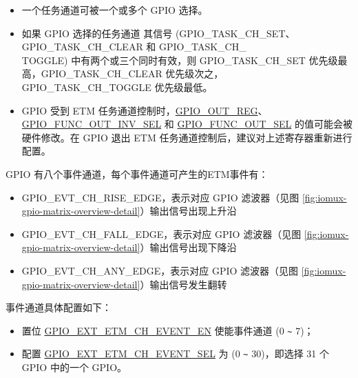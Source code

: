 \documentclass[main\_\_CN.tex]{subfiles}
\begin{document}
\begin{tiplisting}
\vspace{-2em}
\begin{itemize}
\item 一个任务通道可被一个或多个 GPIO 选择。

\item 如果 GPIO 选择的任务通道  其信号 (GPIO\_TASK\_CH\_SET、GPIO\_TASK\_CH\_CLEAR 和 GPIO\_TASK\_CH\_\\TOGGLE) 中有两个或三个同时有效，则 GPIO\_TASK\_CH\_SET 优先级最高，GPIO\_TASK\_CH\_CLEAR 优先级次之，GPIO\_TASK\_CH\_TOGGLE 优先级最低。

\item GPIO 受到 ETM 任务通道控制时，\hyperref[regdesc:GPIOOUTREG]{GPIO\_OUT\_REG}、\hyperref[fielddesc:GPIOFUNCNOUTINVSEL]{GPIO\_FUNC\_OUT\_INV\_SEL} 和 \hyperref[fielddesc:GPIOFUNCNOUTSEL]{GPIO\_FUNC\_OUT\_SEL} 的值可能会被硬件修改。在 GPIO 退出 ETM 任务通道控制后，建议对上述寄存器重新进行配置。
\end{itemize}
\end{tiplisting}

GPIO 有八个事件通道，每个事件通道可产生的ETM事件有：

\begin{itemize}
    \item GPIO\_EVT\_CH\_RISE\_EDGE，表示对应 GPIO 滤波器（见图 \ref{fig:iomux-gpio-matrix-overview-detail}）输出信号出现上升沿
    \item GPIO\_EVT\_CH\_FALL\_EDGE，表示对应 GPIO 滤波器（见图 \ref{fig:iomux-gpio-matrix-overview-detail}）输出信号出现下降沿
    \item GPIO\_EVT\_CH\_ANY\_EDGE，表示对应 GPIO 滤波器（见图 \ref{fig:iomux-gpio-matrix-overview-detail}）输出信号发生翻转
\end{itemize}

事件通道具体配置如下：

\begin{itemize}
    \item 置位 \hyperref[fielddesc:GPIOSDETMCH0EVENTEN]{GPIO\_EXT\_ETM\_CH\_EVENT\_EN} 使能事件通道  (0 \verb+~+ 7)；
    \item 配置 \hyperref[fielddesc:GPIOSDETMCH0EVENTSEL]{GPIO\_EXT\_ETM\_CH\_EVENT\_SEL} 为  (0 \verb+~+ 30)，即选择 31 个 GPIO 中的一个 GPIO。
\end{itemize}
\end{document}
